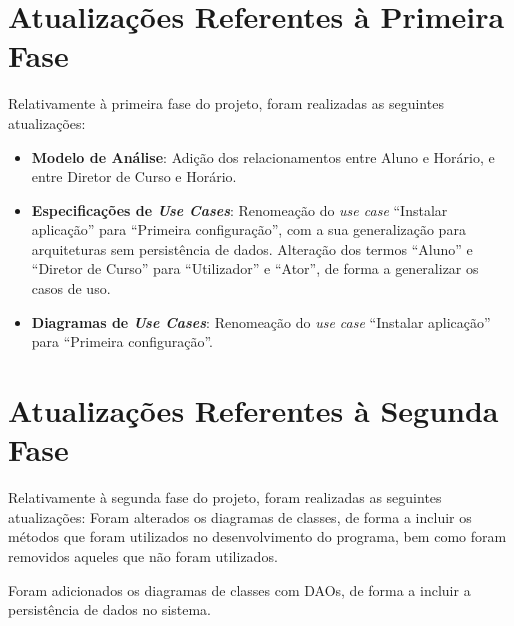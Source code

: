 \documentclass[a4paper,12pt]{scrreprt}
\begin{document}
\chapter{Atualizações Referentes à Primeira Fase}
\vspace{1cm}

Relativamente à primeira fase do projeto, foram realizadas as seguintes atualizações:

\begin{itemize}
    \item \textbf{Modelo de Análise}: Adição dos relacionamentos entre Aluno e Horário, e
        entre Diretor de Curso e Horário.
    \item \textbf{Especificações de \textit{Use Cases}}: Renomeação do \textit{use case}
        “Instalar aplicação” para “Primeira configuração”, com a sua generalização para
        arquiteturas sem persistência de dados. Alteração dos termos “Aluno” e “Diretor de Curso”
        para “Utilizador” e “Ator”, de forma a generalizar os casos de uso.
    \item \textbf{Diagramas de \textit{Use Cases}}: Renomeação do \textit{use case}
        “Instalar aplicação” para “Primeira configuração”.
\end{itemize}



\chapter{Atualizações Referentes à Segunda Fase}
\vspace{1cm}

Relativamente à segunda fase do projeto, foram realizadas as seguintes atualizações:
Foram alterados os diagramas de classes, de forma a incluir os métodos que foram utilizados
no desenvolvimento do programa, bem como foram removidos aqueles que não foram utilizados.

Foram adicionados os diagramas de classes com DAOs, de forma a incluir a persistência de dados
no sistema.


\end{document}
